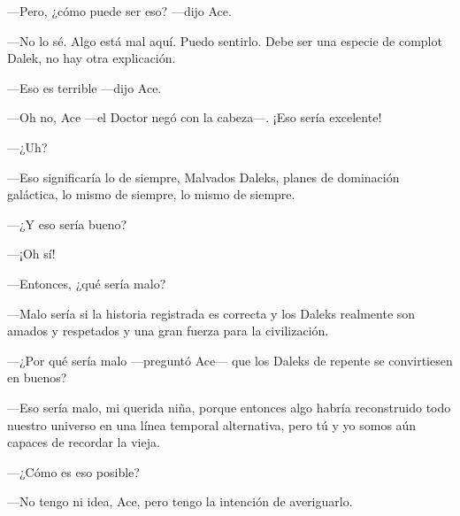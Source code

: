 ---Pero, ¿cómo puede ser eso? ---dijo Ace.

---No lo sé. Algo está mal aquí. Puedo sentirlo. Debe ser una
especie de complot Dalek, no hay otra explicación.

---Eso es terrible ---dijo Ace.

---Oh no, Ace ---el Doctor negó con la cabeza---. ¡Eso sería
excelente!

---¿Uh?

---Eso significaría lo de siempre, Malvados Daleks, planes de
dominación galáctica, lo mismo de siempre, lo mismo de siempre.

---¿Y eso sería bueno?

---¡Oh sí!

---Entonces, ¿qué sería malo?

---Malo sería si la historia registrada es correcta y los Daleks
realmente son amados y respetados y una gran fuerza para la
civilización.

---¿Por qué sería malo ---preguntó Ace--- que los Daleks de
repente se convirtiesen en buenos?

---Eso sería malo, mi querida niña, porque entonces algo habría
reconstruido todo nuestro universo en una línea temporal alternativa,
pero tú y yo somos aún capaces de recordar la vieja.

---¿Cómo es eso posible?

---No tengo ni idea, Ace, pero tengo la intención de
averiguarlo.